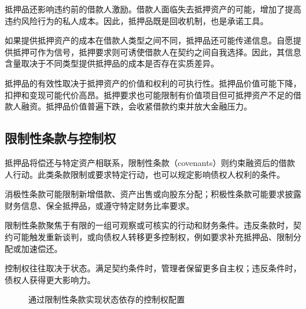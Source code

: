抵押品还影响违约前的借款人激励。借款人面临失去抵押资产的可能，增加了提高违约风险行为的私人成本。因此，抵押品既是回收机制，也是承诺工具。

如果提供抵押资产的成本在借款人类型之间不同，抵押品还可能传递信息。自愿提供抵押可作为信号，抵押要求则可诱使借款人在契约之间自我选择。因此，其信息含量取决于不同类型提供抵押品的成本是否存在实质差异。

抵押品的有效性取决于抵押资产的价值和权利的可执行性。抵押品价值可能下降，扣押和变现可能代价高昂。抵押要求也可能限制有价值项目但可抵押资产不足的借款人融资。抵押品价值普遍下跌，会收紧借款约束并放大金融压力。

\subsection{限制性条款与控制权}

抵押品将偿还与特定资产相联系，限制性条款（covenants）则约束融资后的借款人行动。此类条款限制或要求特定行动，也可以规定影响债权人权利的条件。

消极性条款可能限制新增借款、资产出售或向股东分配；积极性条款可能要求披露财务信息、保全抵押品，或遵守特定财务比率要求。

限制性条款聚焦于有限的一组可观察或可核实的行动和财务条件。违反条款时，契约可能触发重新谈判，或向债权人转移更多控制权，例如要求补充抵押品、限制分配或加速偿还。

控制权往往取决于状态。满足契约条件时，管理者保留更多自主权；违反条件时，债权人获得更大影响力。

\begin{figure}[H]
\centering
{}

\caption{通过限制性条款实现状态依存的控制权配置}
\label{fig:ch3-covenant-control}
\end{figure}

